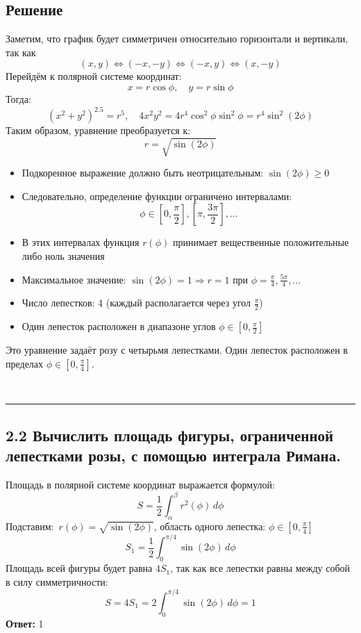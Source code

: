\documentclass{article}
\begin{document}
\subsection*{Решение}
Заметим, что график будет симметричен относительно горизонтали и вертикали, так как
\[
(x, y)  \iff (-x, -y) \iff (-x, y) \iff (x, -y)
\]
Перейдём к полярной системе координат:
\[
x = r\cos\phi, \quad y = r\sin\phi
\]
Тогда:
\[
(x^2 + y^2)^{2.5} = r^5, \quad 4x^2y^2 = 4r^4\cos^2\phi\sin^2\phi = r^4\sin^2(2\phi)
\]
Таким образом, уравнение преобразуется к:
\[
r = \sqrt{\sin(2\phi)}
\]
\begin{itemize}
  \item Подкоренное выражение должно быть неотрицательным: \( \sin(2\phi) \geq 0 \)
  \item Следовательно, определение функции ограничено интервалами:
  \[ \phi \in \left[0, \frac{\pi}{2}\right], \left[\pi, \frac{3\pi}{2}\right], \ldots \]
  \item В этих интервалах функция \(r(\phi)\) принимает вещественные положительные либо ноль значения
  \item Максимальное значение: \( \sin(2\phi) = 1 \Rightarrow r = 1 \) при \(\phi = \frac{\pi}{4}, \frac{5\pi}{4}, \ldots\)
   \item Число лепестков: 4 (каждый располагается через угол \(\frac{\pi}{2}\))
  \item Один лепесток расположен в диапазоне углов \(\phi \in [0, \frac{\pi}{2}]\)
\end{itemize}
Это уравнение задаёт розу с четырьмя лепестками. Один лепесток расположен в пределах \(\phi \in [0, \frac{\pi}{4}]\).
\\
\noindent\rule{\linewidth}{0.4pt}
\subsection*{2.2  Вычислить площадь фигуры, ограниченной лепестками розы, с помощью интеграла Римана.}
Площадь в полярной системе координат выражается формулой:
\[
S = \frac{1}{2}\int_{\alpha}^{\beta} r^2(\phi) \, d\phi
\]
Подставим:\
\(r(\phi) = \sqrt{\sin(2\phi)}\), область одного лепестка: \(\phi \in [0, \frac{\pi}{4}]\)
\[
S_1 = \frac{1}{2} \int_0^{\pi/4} \sin(2\phi) \, d\phi
\]
Площадь всей фигуры будет равна $4S_1$, так как все лепестки равны между собой в силу симметричности:
\[
S = 4S_1 = 2 \int_0^{\pi/4} \sin(2\phi) \, d\phi = 1
\]
\textbf{Ответ:} 1\\
\end{document}
